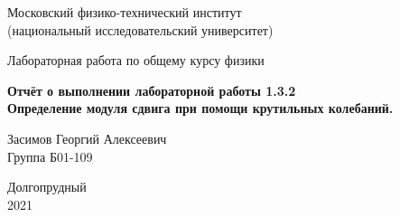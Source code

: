 





\begin{titlepage}

    \newpage
    \begin{center}
        \normalsize Московский физико-технический институт \\(национальный исследовательский университет)
    \end{center}

    \vspace{6em}

    \begin{center}
        \Large Лабораторная работа по общему курсу физики\\
    \end{center}

    \vspace{1em}

    \begin{center}
        \Large \textbf{Отчёт о выполнении лабораторной работы 1.3.2\\ {Определение модуля сдвига при помощи крутильных колебаний.}}
    \end{center}

    \vspace{2em}

    \begin{center}
        \large Засимов Георгий Алексеевич \\
        Группа Б01-109
    \end{center}

    \vspace{\fill}

    \begin{center}
    Долгопрудный \\2021
    \end{center}
    
\end{titlepage}

\newpage

